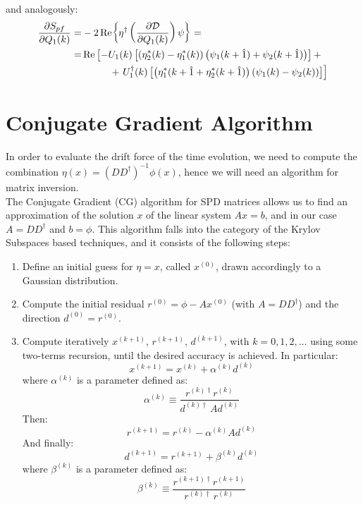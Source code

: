 and analogously: 
\begin{equation}
    \begin{split}
        \pdv{S_{pf}}{Q_1(k)} = & - 2 \Re{\eta^\dagger \left( \pdv{\mathcal{D}}{Q_1(k)} \right) \psi} = \\
        = & \Re\left[-U_1(k) \left[ \left(\eta^*_2(k) - \eta^*_1(k)\right) \left(\psi_1(k + \hat{1}) + \psi_2(k + \hat{1})\right) \right] + \right. \\
        & \hspace{10 mm} + \left. U_1^\dagger(k) \left[ \left( \eta_1^*(k + \hat{1} + \eta_2^*(k + \hat{1}) \right) \left( \psi_1(k) - \psi_2(k) \right) \right] \right]
    \end{split}
\end{equation}

\section{Conjugate Gradient Algorithm}
In order to evaluate the drift force of the time evolution, we need to compute the combination $\eta(x) = (DD^\dagger)^{-1} \phi(x)$, hence we will need an algorithm for matrix inversion. \\ The Conjugate Gradient (CG) algorithm for SPD matrices \cite{Hestenes1952MethodsOC} allows us to find an approximation of the solution $x$ of the linear system $Ax = b$, and in our case $A = DD^{\dagger}$ and $b = \phi$. This algorithm falls into the category of the Krylov Subspaces based techniques, and it consists of the following steps:
\begin{enumerate}
    \item Define an initial guess for $\eta = x$, called $x^{(0)}$, drawn accordingly to a Gaussian distribution.
    \item Compute the initial residual $r^{(0)} = \phi - Ax^{(0)}$ (with $A = DD^\dagger$) and the direction $d^{(0)} = r^{(0)}$. 
    \item Compute iteratively $x^{(k+1)}$, $r^{(k+1)}$, $d^{(k+1)}$, with $k = 0, 1, 2, \dots$ using some two-terms recursion, until the desired accuracy is achieved. In particular:
    \begin{equation}
        x^{(k+1)} = x^{(k)} + \alpha^{(k)}d^{(k)}
    \end{equation}
    where $\alpha^{(k)}$ is a parameter defined as:
    \begin{equation}
        \alpha^{(k)} \equiv \frac{r^{(k)\dagger} r^{(k)}}{d^{(k)\dagger}\, Ad^{(k)}}
    \end{equation}
    Then:
    \begin{equation}
        r^{(k+1)} = r^{(k)} - \alpha^{(k)} Ad^{(k)}
    \end{equation}
    And finally:
    \begin{equation}
        d^{(k+1)} = r^{(k+1)} + \beta^{(k)} d^{(k)}
    \end{equation}
    where $\beta^{(k)}$ is a parameter defined as:
    \begin{equation}
        \beta^{(k)} \equiv \frac{r^{(k+1)\dagger} r^{(k+1)}}{r^{(k)\dagger}\, r^{(k)}}
    \end{equation}
\end{enumerate}
